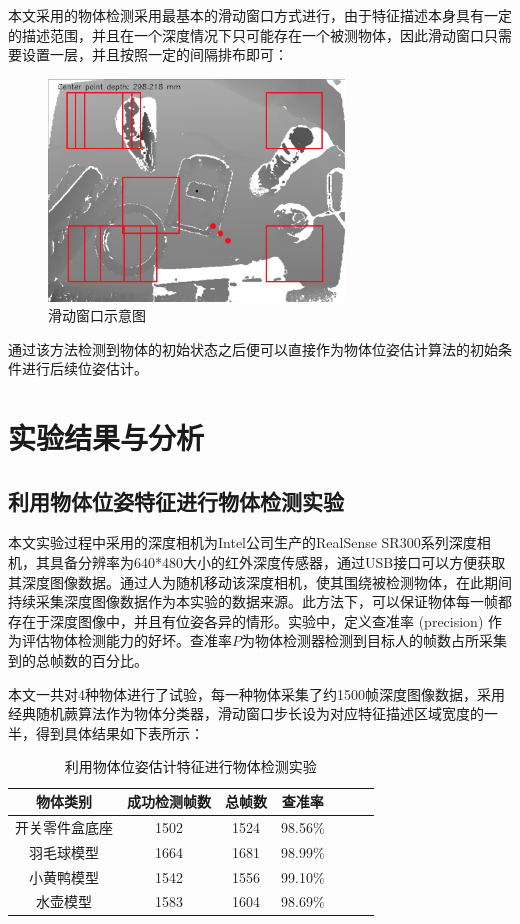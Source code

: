 本文采用的物体检测采用最基本的滑动窗口方式进行，由于特征描述本身具有一定的描述范围，并且在一个深度情况下只可能存在一个被测物体，因此滑动窗口只需要设置一层，并且按照一定的间隔排布即可：

\begin{figure}[htb]
	\centering 
	\includegraphics[width=0.7\textwidth]{./mypic/滑动窗口示意图.jpg} 
	\caption{滑动窗口示意图} 
\end{figure}
通过该方法检测到物体的初始状态之后便可以直接作为物体位姿估计算法的初始条件进行后续位姿估计。

\section{实验结果与分析} %

\subsection{利用物体位姿特征进行物体检测实验}

本文实验过程中采用的深度相机为Intel公司生产的RealSense SR300系列深度相机，其具备分辨率为640*480大小的红外深度传感器，通过USB接口可以方便获取其深度图像数据。通过人为随机移动该深度相机，使其围绕被检测物体，在此期间持续采集深度图像数据作为本实验的数据来源。此方法下，可以保证物体每一帧都存在于深度图像中，并且有位姿各异的情形。实验中，定义查准率 (precision) 作为评估物体检测能力的好坏。查准率$P$为物体检测器检测到目标人的帧数占所采集到的总帧数的百分比。

本文一共对4种物体进行了试验，每一种物体采集了约1500帧深度图像数据，采用经典随机蕨算法作为物体分类器，滑动窗口步长设为对应特征描述区域宽度的一半，得到具体结果如下表所示：

\begin{table}[htb]
	\caption{利用物体位姿估计特征进行物体检测实验} 
	\centering 
	\begin{tabular}[t]{
		ccccccc} 
		\toprule
		物体类别 & 成功检测帧数 & 总帧数 & 查准率\\ 
		\midrule
		开关零件盒底座 & 1502 & 1524 & 98.56\% \\
		羽毛球模型 & 1664 & 1681 & 98.99\% \\
		小黄鸭模型 & 1542 & 1556 & 99.10\% \\
		水壶模型 & 1583 & 1604 & 98.69\% \\
		\bottomrule
	\end{tabular}
\end{table}

